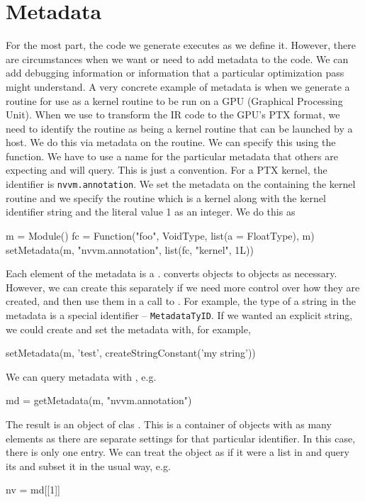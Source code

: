 
\section{Metadata}
For the most part, the code we generate executes as we define it.
However, there are circumstances when we want or need to add metadata
to the code.  We can add debugging information or information that a
particular optimization pass might understand.  A very concrete
example of metadata is when we generate a routine for use as a kernel
routine to be run on a GPU (Graphical Processing Unit).
When we use  to transform the \llvm{} IR code to 
the GPU's PTX format, we need to identify the routine as being a
kernel routine that can be launched by a host. 
We do this via metadata on the routine.
We can specify this using the  function.
We have to use a name for the particular metadata that others are
expecting and will query.  This is just a convention.
For a PTX kernel, the identifier is \texttt{nvvm.annotation}.
We set the metadata on the  containing the 
kernel routine and we specify the routine which is a kernel
along with the kernel identifier string and the literal value 1 as an
integer.
We do this as
\begin{RCode}
m = Module()
fc = Function("foo", VoidType, list(a = FloatType), m)
setMetadata(m, "nvvm.annotation", list(fc, "kernel", 1L))
\end{RCode}
Each element of the metadata is a .
 converts \R{} objects to 
objects as necessary. However, we can create this separately
if we need more control over how they are created,
and then use them in a call to .
For example, the type of a string in the metadata 
is a special identifier -- \texttt{MetadataTyID}.
If we wanted an explicit string, we could create and set the metadata
with, for example,
\begin{RCode}
setMetadata(m, 'test', createStringConstant('my string'))
\end{RCode}

We can query metadata with , e.g. 
\begin{RCode}
md = getMetadata(m, "nvvm.annotation")
\end{RCode}
The result is an object of clas .
This is a container of  objects
with as many elements as there are separate settings
for that particular identifier. In this case, there
is only one entry.
We can treat the  object as if it were a list in
\R{} and query its  and subset it in the usual way, e.g.
\begin{RCode}
nv = md[[1]]
\end{RCode}

